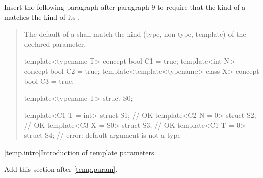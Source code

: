 Insert the following paragraph after paragraph 9 to require that the
kind of a  matches the kind of its
.

\begin{quote}
\setcounter{Paras}{11}
\pnum
The default  of
a  shall match
the kind (type, non-type, template) of the declared parameter.
% 
\enterexample
\begin{codeblock}
template<typename T> concept bool C1 = true;
template<int N> concept bool C2 = true;
template<template<typename> class X> concept bool C3 = true;

template<typename T> struct S0;

template<C1 T = int> struct S1; // OK
template<C2 N = 0> struct S2;   // OK
template<C3 X = S0> struct S3;  // OK
template<C1 T = 0> struct S4;   // error: default argument is not a type
\end{codeblock}
\exitexample
\end{quote}


[temp.intro]{Introduction of template parameters}

Add this section after \ref{temp.param}.

